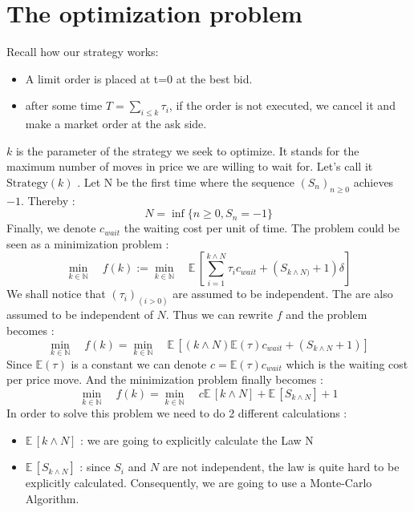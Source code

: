 \documentclass{article}
\newcommand{\Min}[2]{ {#1} \wedge {#2} }
\begin{document}
\section{The optimization problem}
Recall how our strategy works:
\begin{itemize}
	\item A limit order is placed at t=0 at the best bid.
	\item after some time $T = \sum_{i \leq k} \tau_i$, if the order is not executed, we cancel it and make a market order at the ask side.
\end{itemize}
$k$ is the parameter of the strategy we seek to optimize. It stands for the maximum number of moves in price we are willing to wait for. Let's call it $\text{Strategy}(k)$ .
Let N be the first time where the sequence $(S_{n})_{n\geq0}$  achieves $-1$. Thereby :
$$ N= \inf \{ n\geq0 , S_{n}=-1   \} $$
Finally, we denote $c_{wait}$ the waiting cost per unit of time.
The problem could be seen as a minimization problem  :
\begin{equation}
 \min\limits_{k \in \mathbb{N}} \quad f(k) := \min\limits_{k \in \mathbb{N}} \quad \mathbb{E}\,\left[ \sum_{i=1}^{\Min k N}\tau_i c_{wait} + (S_{\Min k N)}+1)\delta\right]
\end{equation}
We shall notice that $(\tau_i)_{(i>0)}$ are assumed to be independent. The are also assumed to be independent of $N$.
Thus we can rewrite $f$ and the problem becomes : 
\begin{equation}
 \min\limits_{k \in \mathbb{N}} \quad f(k)= \min\limits_{k \in \mathbb{N}} \quad \mathbb{E}\,\left[ ({\Min k N})  \mathbb{E}(\tau) c_{wait} + (S_{\Min k N}+1) \right]
\end{equation}
Since $\mathbb{E}(\tau)$ is a constant we can denote
$c = \mathbb{E}(\tau) c_{wait}$ which is the waiting cost per price move. And the minimization problem finally becomes :
\begin{equation}
 \min\limits_{k \in \mathbb{N}} \quad f(k)= \min\limits_{k \in \mathbb{N}} \quad c \mathbb{E}\,\left[ {\Min k N}\right]   +  \mathbb{E}\,\left[S_{\Min k N}\right] +1
\end{equation}
In order to solve this problem we need to do 2 different calculations :
\begin{itemize}
\item $\mathbb{E}\,\left[ {\Min k N}\right]$ : we are going to explicitly calculate the Law N
\item $\mathbb{E}\,\left[S_{\Min k N}\right]$ : since $S_i$ and $N$ are not independent, the law is quite hard to be explicitly calculated. Consequently, we are going to use a Monte-Carlo Algorithm.
\end{itemize}
\end{document}
